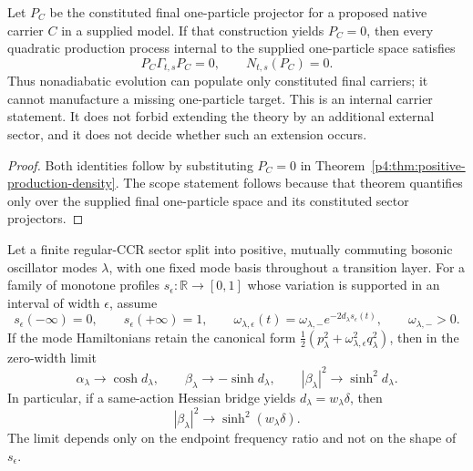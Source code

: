 \documentclass[12pt,a4paper]{article}
\begin{document}
\begin{corollary}
\label{p4:cor:absent-target-production}
Let \(P_C\) be the constituted final one-particle projector for a proposed
native carrier \(C\) in a supplied model.  If that construction yields
\(P_C=0\), then every quadratic production process internal to the supplied
one-particle space satisfies
\begin{equation}
 \label{p4:eq:absent-target-zero-production}
 \boxed{P_C\Gamma_{t,s}P_C=0,\qquad N_{t,s}(P_C)=0.}
\end{equation}
Thus nonadiabatic evolution can populate only constituted final carriers; it
cannot manufacture a missing one-particle target.  This is an internal
carrier statement.  It does not forbid extending the theory by an additional
external sector, and it does not decide whether such an extension occurs.
\end{corollary}

\begin{proof}
Both identities follow by substituting \(P_C=0\) in
Theorem~\ref{p4:thm:positive-production-density}.  The scope statement follows
because that theorem quantifies only over the supplied final one-particle
space and its constituted sector projectors.
\end{proof}

\begin{theorem}
\label{p4:thm:profile-independent-thin-layer-squeeze}
Let a finite regular-CCR sector split into positive, mutually commuting
bosonic oscillator modes \(\lambda\), with one fixed mode basis throughout a
transition layer.  For a family of monotone profiles
\(s_\epsilon:\mathbb R\to[0,1]\) whose variation is supported in an interval
of width \(\epsilon\), assume
\[
 s_\epsilon(-\infty)=0,\qquad s_\epsilon(+\infty)=1,\qquad
 \omega_{\lambda,\epsilon}(t)
 =\omega_{\lambda,-}e^{-2d_\lambda s_\epsilon(t)},
 \qquad \omega_{\lambda,-}>0.
\]
If the mode Hamiltonians retain the canonical form
\(\tfrac12(p_\lambda^2+\omega_{\lambda,\epsilon}^2q_\lambda^2)\), then in
the zero-width limit
\begin{equation}
\label{p4:eq:thin-layer-bogoliubov-law}
 \boxed{\alpha_\lambda\longrightarrow\cosh d_\lambda,\qquad
 \beta_\lambda\longrightarrow-\sinh d_\lambda,\qquad
 |\beta_\lambda|^2\longrightarrow\sinh^2 d_\lambda.}
\end{equation}
In particular, if a same-action Hessian bridge yields
\(d_\lambda=w_\lambda\delta\), then
\begin{equation}
\label{p4:eq:delta-weighted-thin-layer-production}
 \boxed{|\beta_\lambda|^2\longrightarrow
 \sinh^2(w_\lambda\delta).}
\end{equation}
The limit depends only on the endpoint frequency ratio and not on the shape
of \(s_\epsilon\).
\end{theorem}
\end{document}
